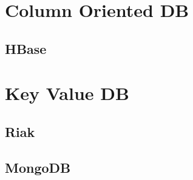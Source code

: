 \part{Column Oriented DB}
\chapter{HBase}


\part{Key Value DB}
\chapter{Riak}





\chapter{MongoDB}






